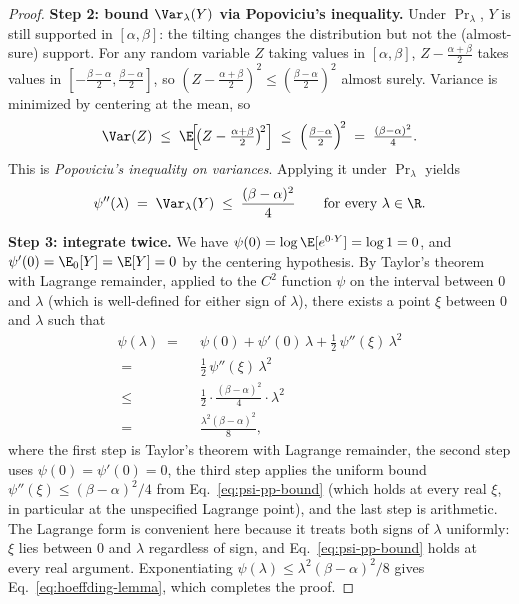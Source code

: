 \begin{proof}
\smallskip\noindent\textbf{Step 2: bound $\Var_\lambda(Y)$ via Popoviciu's inequality.}
Under $\Pr_\lambda$, $Y$ is still supported in $[\alpha, \beta]$: the tilting changes
the distribution but not the (almost-sure) support. For any random variable $Z$ taking
values in $[\alpha, \beta]$, $Z - \tfrac{\alpha + \beta}{2}$ takes values in
$[-\tfrac{\beta - \alpha}{2}, \tfrac{\beta - \alpha}{2}]$, so
$(Z - \tfrac{\alpha + \beta}{2})^2 \le (\tfrac{\beta - \alpha}{2})^2$ almost surely.
Variance is minimized by centering at the mean, so
\begin{align}\label{eq:popoviciu}
\Var(Z) \;\le\; \E\!\Bigl[\!\bigl(Z - \tfrac{\alpha + \beta}{2}\bigr)^{\!2}\Bigr]
\;\le\; \Bigl(\tfrac{\beta - \alpha}{2}\Bigr)^{\!2} \;=\; \tfrac{(\beta - \alpha)^2}{4}.
\end{align}
This is \emph{Popoviciu's inequality on variances}. Applying it under $\Pr_\lambda$
yields
\begin{align}\label{eq:psi-pp-bound}
\psi''(\lambda) \;=\; \Var_\lambda(Y) \;\le\; \frac{(\beta - \alpha)^2}{4}
\qquad \text{for every } \lambda \in \R.
\end{align}

\smallskip\noindent\textbf{Step 3: integrate twice.}
We have $\psi(0) = \log \E[e^{0 \cdot Y}] = \log 1 = 0$, and
$\psi'(0) = \E_0[Y] = \E[Y] = 0$ by the centering hypothesis. By Taylor's theorem
with Lagrange remainder, applied to the $C^2$ function $\psi$ on the interval
between $0$ and $\lambda$ (which is well-defined for either sign of $\lambda$),
there exists a point $\xi$ between $0$ and $\lambda$ such that
\begin{align*}
\psi(\lambda)
\;=\; & ~ \psi(0) + \psi'(0)\, \lambda + \tfrac{1}{2}\, \psi''(\xi)\, \lambda^2 \\
\;=\; & ~ \tfrac{1}{2}\, \psi''(\xi)\, \lambda^2 \\
\;\le\; & ~ \tfrac{1}{2} \cdot \tfrac{(\beta - \alpha)^2}{4} \cdot \lambda^2 \\
\;=\; & ~ \tfrac{\lambda^2 (\beta - \alpha)^2}{8},
\end{align*}
where the first step is Taylor's theorem with Lagrange remainder, the second step
uses $\psi(0) = \psi'(0) = 0$, the third step applies the uniform bound
$\psi''(\xi) \le (\beta - \alpha)^2/4$ from Eq.~\eqref{eq:psi-pp-bound} (which
holds at every real $\xi$, in particular at the unspecified Lagrange point), and
the last step is arithmetic. The Lagrange form is convenient here because it
treats both signs of $\lambda$ uniformly: $\xi$ lies between $0$ and $\lambda$
regardless of sign, and Eq.~\eqref{eq:psi-pp-bound} holds at every real argument.
Exponentiating $\psi(\lambda) \le \lambda^2 (\beta - \alpha)^2 / 8$ gives
Eq.~\eqref{eq:hoeffding-lemma}, which completes the proof.
\end{proof}

